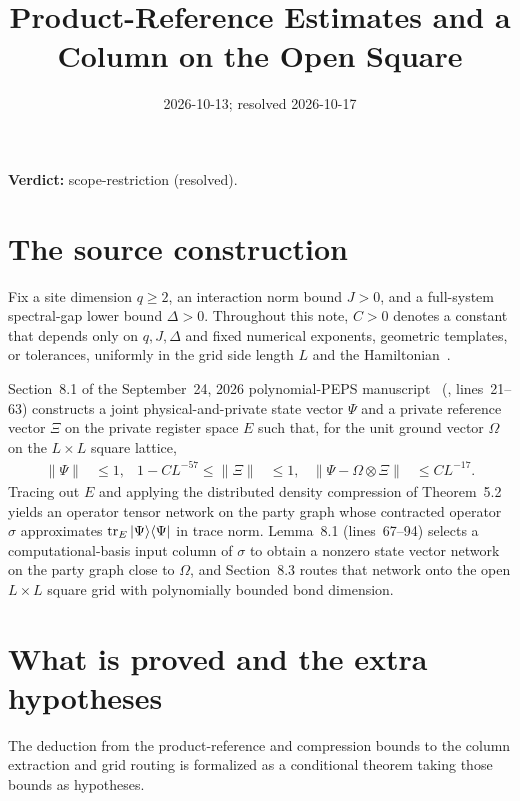\documentclass{article}
\title{Product-Reference Estimates and a Column on the Open Square}
\author{}
\date{2026-10-13; resolved 2026-10-17}
\providecommand{\gapnote}[2]{\par\noindent\textbf{Verdict:} #1 (#2).\par}
\begin{document}
\maketitle
\gapnote{scope-restriction}{resolved}

\section{The source construction}

Fix a site dimension $q\ge2$, an interaction norm bound $J>0$, and a
full-system spectral-gap lower bound $\Delta>0$. Throughout this note, $C>0$
denotes a constant that depends only on $q,J,\Delta$ and fixed numerical
exponents, geometric templates, or tolerances, uniformly in the grid side
length $L$ and the Hamiltonian~\cite{OpenAI2026PolynomialPEPS}.

Section~8.1 of the September~24, 2026 polynomial-PEPS
manuscript~\cite{OpenAI2026PolynomialPEPS} (,
lines~21--63) constructs a joint physical-and-private state vector $\Psi$ and a
private reference vector $\Xi$ on the private register space $E$ such that, for
the unit ground vector $\Omega$ on the $L\times L$ square lattice,
\begin{align}
    \|\Psi\| &\leq 1,
    &1-CL^{-57}\leq\|\Xi\| &\leq 1,
    &\|\Psi-\Omega\otimes\Xi\| &\leq CL^{-17}.
    \label{eq:polypeps_reference_source}
\end{align}
Tracing out $E$ and applying the distributed density compression of
Theorem~5.2 yields an operator tensor network on the party graph whose
contracted operator $\sigma$ approximates $\operatorname{tr}_E|\Psi\rangle\langle\Psi|$ in
trace norm. Lemma~8.1 (lines~67--94) selects a computational-basis input column
of $\sigma$ to obtain a nonzero state vector network on the party graph close
to $\Omega$, and Section~8.3 routes that network onto the open $L\times L$
square grid with polynomially bounded bond dimension.

\section{What is proved and the extra hypotheses}

The deduction from the product-reference and compression bounds to the column
extraction and grid routing is formalized as a conditional theorem taking those
bounds as hypotheses.
\end{document}
